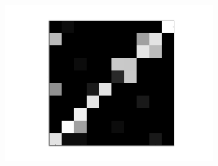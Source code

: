 \begin{figure}[h!]
\begin{subfigure}{.25\textwidth}
  		\label{fig:sub1}
	\end{subfigure}%
	\begin{subfigure}{.25\textwidth}
  		\centering
  		\includegraphics[width=0.8\linewidth]{imgs/reconst/00007.png}
  		\label{fig:sub1}
	\end{subfigure}%
	

\end{figure}

